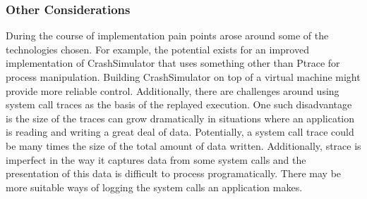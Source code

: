     \subsubsection{Other Considerations}

    During the course of implementation pain points arose around some of the technologies chosen.  For example, the
    potential exists for an improved implementation of CrashSimulator that uses something other than Ptrace for process
    manipulation.  Building CrashSimulator on top of a virtual machine might provide more reliable control.
    Additionally, there are challenges around using system call traces as the basis of the replayed execution.  One such
    disadvantage is the size of the traces can grow dramatically in situations where an application is reading and
    writing a great deal of data.  Potentially, a system call trace could be many times the size of the total amount of
    data written.  Additionally, strace is imperfect in the way it captures data from some system calls and the
    presentation of this data is difficult to process programatically.  There may be more suitable ways of logging the
    system calls an application makes.
    